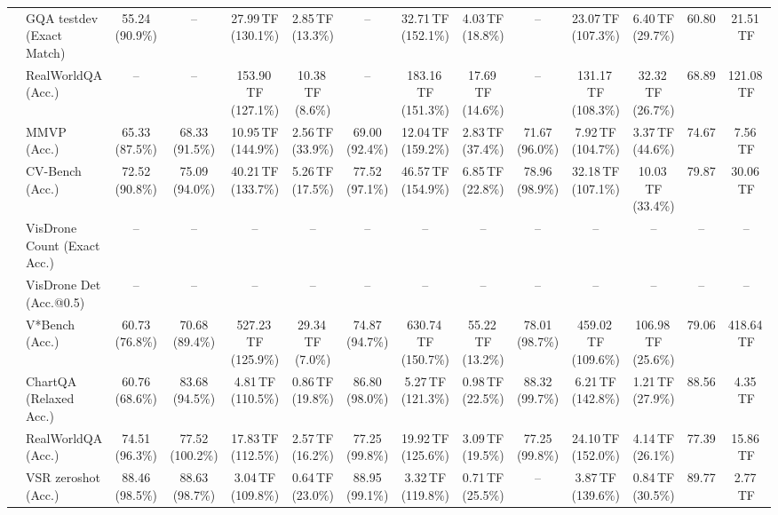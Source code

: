 \begin{table}[t]
\begin{center}
\begin{small}
\begin{sc}
{\begin{tabular}{llcccccccccccc}
& GQA testdev (Exact Match) & 55.24 (90.9\%) & -- & 27.99\,TF (130.1\%) & 2.85\,TF (13.3\%) & -- & 32.71\,TF (152.1\%) & 4.03\,TF (18.8\%) & -- & 23.07\,TF (107.3\%) & 6.40\,TF (29.7\%) & 60.80 & 21.51\,TF \\
& RealWorldQA (Acc.) & -- & -- & 153.90\,TF (127.1\%) & 10.38\,TF (8.6\%) & -- & 183.16\,TF (151.3\%) & 17.69\,TF (14.6\%) & -- & 131.17\,TF (108.3\%) & 32.32\,TF (26.7\%) & 68.89 & 121.08\,TF \\
& MMVP (Acc.) & 65.33 (87.5\%) & 68.33 (91.5\%) & 10.95\,TF (144.9\%) & 2.56\,TF (33.9\%) & 69.00 (92.4\%) & 12.04\,TF (159.2\%) & 2.83\,TF (37.4\%) & 71.67 (96.0\%) & 7.92\,TF (104.7\%) & 3.37\,TF (44.6\%) & 74.67 & 7.56\,TF \\
& CV-Bench (Acc.) & 72.52 (90.8\%) & 75.09 (94.0\%) & 40.21\,TF (133.7\%) & 5.26\,TF (17.5\%) & 77.52 (97.1\%) & 46.57\,TF (154.9\%) & 6.85\,TF (22.8\%) & 78.96 (98.9\%) & 32.18\,TF (107.1\%) & 10.03\,TF (33.4\%) & 79.87 & 30.06\,TF \\
& VisDrone Count (Exact Acc.) & -- & -- & -- & -- & -- & -- & -- & -- & -- & -- & -- & -- \\
& VisDrone Det (Acc.@0.5) & -- & -- & -- & -- & -- & -- & -- & -- & -- & -- & -- & -- \\
& V*Bench (Acc.) & 60.73 (76.8\%) & 70.68 (89.4\%) & 527.23\,TF (125.9\%) & 29.34\,TF (7.0\%) & 74.87 (94.7\%) & 630.74\,TF (150.7\%) & 55.22\,TF (13.2\%) & 78.01 (98.7\%) & 459.02\,TF (109.6\%) & 106.98\,TF (25.6\%) & 79.06 & 418.64\,TF \\
\midrule
{}
& ChartQA (Relaxed Acc.) & 60.76 (68.6\%) & 83.68 (94.5\%) & 4.81\,TF (110.5\%) & 0.86\,TF (19.8\%) & 86.80 (98.0\%) & 5.27\,TF (121.3\%) & 0.98\,TF (22.5\%) & 88.32 (99.7\%) & 6.21\,TF (142.8\%) & 1.21\,TF (27.9\%) & 88.56 & 4.35\,TF \\
& RealWorldQA (Acc.) & 74.51 (96.3\%) & 77.52 (100.2\%) & 17.83\,TF (112.5\%) & 2.57\,TF (16.2\%) & 77.25 (99.8\%) & 19.92\,TF (125.6\%) & 3.09\,TF (19.5\%) & 77.25 (99.8\%) & 24.10\,TF (152.0\%) & 4.14\,TF (26.1\%) & 77.39 & 15.86\,TF \\
& VSR zeroshot (Acc.) & 88.46 (98.5\%) & 88.63 (98.7\%) & 3.04\,TF (109.8\%) & 0.64\,TF (23.0\%) & 88.95 (99.1\%) & 3.32\,TF (119.8\%) & 0.71\,TF (25.5\%) & -- & 3.87\,TF (139.6\%) & 0.84\,TF (30.5\%) & 89.77 & 2.77\,TF \\

\end{tabular}}
\end{sc}
\end{small}
\end{center}
\end{table}
